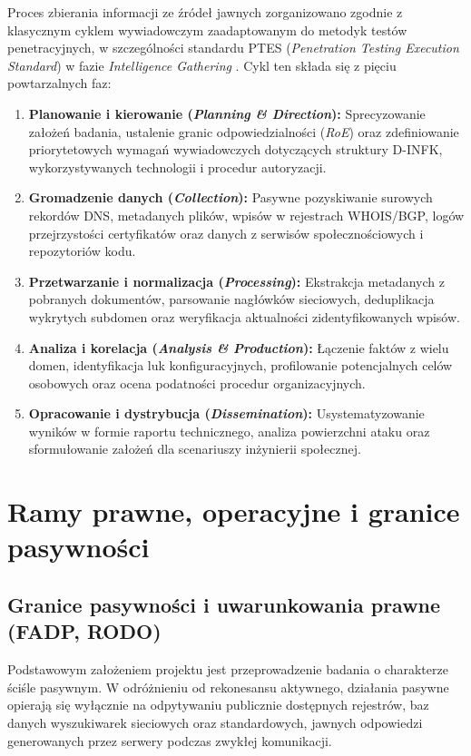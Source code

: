 Proces zbierania informacji ze źródeł jawnych zorganizowano zgodnie z klasycznym cyklem wywiadowczym zaadaptowanym do metodyk testów penetracyjnych, w szczególności standardu PTES (\textit{Penetration Testing Execution Standard}) w fazie \textit{Intelligence Gathering} \cite{ptes2014}. Cykl ten składa się z pięciu powtarzalnych faz:
\begin{enumerate}
    \item \textbf{Planowanie i kierowanie (\textit{Planning \& Direction}):} Sprecyzowanie założeń badania, ustalenie granic odpowiedzialności (\textit{RoE}) oraz zdefiniowanie priorytetowych wymagań wywiadowczych dotyczących struktury D-INFK, wykorzystywanych technologii i procedur autoryzacji.
    \item \textbf{Gromadzenie danych (\textit{Collection}):} Pasywne pozyskiwanie surowych rekordów DNS, metadanych plików, wpisów w rejestrach WHOIS/BGP, logów przejrzystości certyfikatów oraz danych z serwisów społecznościowych i repozytoriów kodu.
    \item \textbf{Przetwarzanie i normalizacja (\textit{Processing}):} Ekstrakcja metadanych z pobranych dokumentów, parsowanie nagłówków sieciowych, deduplikacja wykrytych subdomen oraz weryfikacja aktualności zidentyfikowanych wpisów.
    \item \textbf{Analiza i korelacja (\textit{Analysis \& Production}):} Łączenie faktów z wielu domen, identyfikacja luk konfiguracyjnych, profilowanie potencjalnych celów osobowych oraz ocena podatności procedur organizacyjnych.
    \item \textbf{Opracowanie i dystrybucja (\textit{Dissemination}):} Usystematyzowanie wyników w formie raportu technicznego, analiza powierzchni ataku oraz sformułowanie założeń dla scenariuszy inżynierii społecznej.
\end{enumerate}

\section{Ramy prawne, operacyjne i granice pasywności}\label{sec:etyka-anonimizacja}

\subsection{Granice pasywności i uwarunkowania prawne (FADP, RODO)}\label{subsec:zgodnosc-prawna}

Podstawowym założeniem projektu jest przeprowadzenie badania o charakterze ściśle pasywnym. W odróżnieniu od rekonesansu aktywnego, działania pasywne opierają się wyłącznie na odpytywaniu publicznie dostępnych rejestrów, baz danych wyszukiwarek sieciowych oraz standardowych, jawnych odpowiedzi generowanych przez serwery podczas zwykłej komunikacji.

